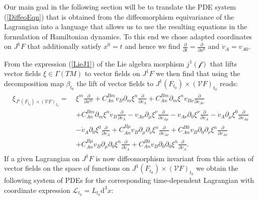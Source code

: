 \documentclass[a4paper,12pt, DIV=14, BCOR=5mm, twoside, headsepline, numbers=noenddot]{scrbook}
\begin{document}
Our main goal in the following section will be to translate the PDE system (\ref{DiffeoEqn}) that is obtained from the diffeomorphism equivariance of the Lagrangian into a language that allows us to use the resulting equations in the formulation of Hamiltonian dynamics. To this end we chose adapted coordinates on $J^1F$ that additionally satisfy $x^0 = t$ and hence we find $\frac{\partial}{\partial t} = \frac{\partial}{\partial x^0}$ and $\dot{v}_A = v_{A0}$. 

From the expression (\ref{LieJ1}) of the Lie algebra morphism $j^1(\mathcal{f})$ that lifts vector fields $\xi \in \Gamma(TM)$ to vector fields on $J^1F$ we then find that using the decomposition map $\beta_{t_0}$ the lift of vector fields to $J^1(F_{t_0}) \times (\mathcal{V}F)_{t_0}$ reads:
\begin{align}\label{LieJ1Dec}
\begin{aligned}
    \xi_{J^1(F_{t_0}) \times (\mathcal{V}F)_{t_0}} = \ &\xi^m \frac{\partial}{\partial x^m} + C_{An}^{Bm} v_B \partial_{m} \xi ^n \frac{\partial}{\partial v_A}
    + C_{An}^{Bm} \partial_{m} \xi^n v_{B\nu} \frac{\partial}{\partial v_{A\nu}}\\
    &+ C_{An}^{Bm} \partial_{m} \xi^n \dot{v}_{B} \frac{\partial}{\partial \dot{v}_A} - v_{A\nu} \partial_{\mu} \xi^{\nu} \frac{\partial}{\partial v_{A\mu}} 
     - v_{A\nu} \partial_{0} \xi^{\nu} \frac{\partial}{\partial \dot{v}_{A}} 
    - \dot{v}_{A} \partial_{\mu} \xi^{0} \frac{\partial}{\partial v_{A\mu}}\\
     &- \dot{v}_{A} \partial_{0} \xi^{0} \frac{\partial}{\partial \dot{v}_{A}}
    + C_{An}^{B\mu} v_B \partial_{\mu} \partial_{\nu} \xi^n \frac{\partial}{\partial v_{A\nu}}
    + C_{An}^{B0} v_B \partial_{0} \partial_{\nu} \xi^n \frac{\partial}{\partial v_{A\nu}}\\
    &+ C_{An}^{B\mu} v_B \partial_{\mu} \partial_{0} \xi^n \frac{\partial}{\partial \dot{v}_{A}}
    + C_{An}^{B0} v_B \partial_{0} \partial_{0} \xi^n \frac{\partial}{\partial \dot{v}_{A}}.
\end{aligned}
\end{align}
If a given Lagrangian on $J^1F$ is now diffeomorphism invariant from this action of vector fields on the space of functions on $J^1(F_{t_0}) \times (\mathcal{V}F)_{t_0}$ we obtain the following system of PDEs for the corresponding time-dependent Lagrangian with coordinate expression $\mathcal{L}_{t_0} = L_{t_0}\mathrm{d}^3x$:
\end{document}
